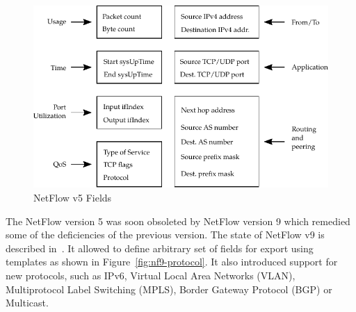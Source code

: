 \begin{figure}[t!]
  \begin{center}
    \includegraphics[width=\textwidth]{figures/nf5-fields}
  \end{center}
  \caption{NetFlow v5 Fields}
  \label{fig:nf5-fields}
\end{figure}

The NetFlow version 5 was soon obsoleted by NetFlow version 9 which remedied some of the deficiencies of the previous version. The state of NetFlow v9 is described in~\cite{rfc3954}. It allowed to define arbitrary set of fields for export using templates as shown in Figure~\ref{fig:nf9-protocol}. It also introduced support for new protocols, such as IPv6, Virtual Local Area Networks (VLAN), Multiprotocol Label Switching (MPLS), Border Gateway Protocol (BGP) or Multicast. 

